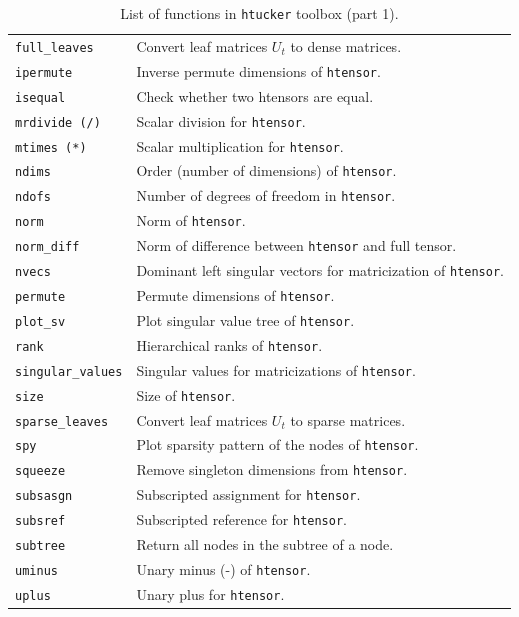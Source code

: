 \documentclass[11pt, a4paper]{article}
\newcommand{\htucker}{{\tt htucker}}
\begin{document}
\begin{preprint}
\begin{table}[h]
\begin{tabular}{|p{3.2cm}|p{11cm}|}
\texttt{full\_leaves}        & Convert leaf matrices $U_t$ to dense matrices. \\
\texttt{ipermute}           & Inverse permute dimensions of {\tt htensor}.\\
\texttt{isequal}            & Check whether two htensors are equal.\\
\texttt{mrdivide (/)}       & Scalar division for {\tt htensor}.\\
\texttt{mtimes (*)}         & Scalar multiplication for {\tt htensor}.\\
\texttt{ndims}              & Order (number of dimensions) of {\tt htensor}.\\
\texttt{ndofs}              & Number of degrees of freedom in {\tt htensor}.\\
\texttt{norm}               & Norm of {\tt htensor}.\\
\texttt{norm\_diff}         & Norm of difference between {\tt htensor} and full tensor.\\
\texttt{nvecs}              & Dominant left singular vectors for matricization of {\tt htensor}.\\
\texttt{permute}            & Permute dimensions of {\tt htensor}.\\
\texttt{plot\_sv}           & Plot singular value tree of {\tt htensor}.\\
\texttt{rank}               & Hierarchical ranks of {\tt htensor}.\\
\texttt{singular\_values}   & Singular values for matricizations of {\tt htensor}.\\
\texttt{size}               & Size of {\tt htensor}.\\
\texttt{sparse\_leaves}      & Convert leaf matrices $U_t$ to sparse matrices. \\
\texttt{spy}                & Plot sparsity pattern of the nodes of {\tt htensor}.\\
\texttt{squeeze}            & Remove singleton dimensions from {\tt htensor}.\\
\texttt{subsasgn}           & Subscripted assignment for {\tt htensor}.\\
\texttt{subsref}            & Subscripted reference for {\tt htensor}.\\
\texttt{subtree}            & Return all nodes in the subtree of a node.\\
\texttt{uminus}             & Unary minus (-) of {\tt htensor}.\\
\texttt{uplus}              & Unary plus for {\tt htensor}.\\
\hline 
\end{tabular}
  \caption{List of functions in \htucker{} toolbox (part 1).} \label{tab:htucker_functions1}
\end{table}


\end{preprint}
\end{document}
